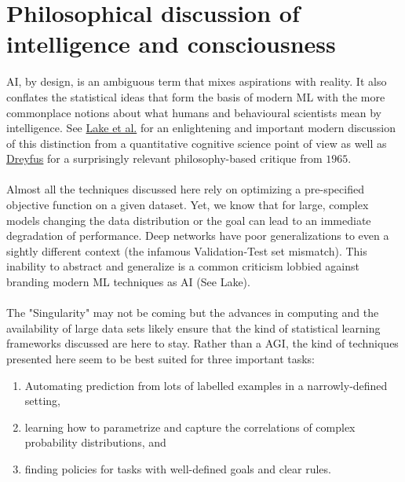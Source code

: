 \chapter{Philosophical discussion of intelligence and consciousness}
AI, by design, is an ambiguous term that mixes aspirations with reality. It also conflates the statistical ideas that form the basis of modern ML with the more commonplace notions about what humans and behavioural scientists mean by intelligence. See \href{https://arxiv.org/abs/1604.00289}{Lake et al.} for an enlightening and important modern discussion of this distinction from a quantitative cognitive science point of view as well as \href{https://www.rand.org/pubs/papers/P3244.html}{Dreyfus} for a surprisingly relevant philosophy-based critique from $1965$.\\
\\
Almost all the techniques discussed here rely on optimizing a pre-specified objective function on a given dataset. Yet, we know that for large, complex models changing the data distribution or the goal can lead to an immediate degradation of performance. Deep networks have poor generalizations to even a sightly different context (the infamous Validation-Test set mismatch). This inability to abstract and generalize is a common criticism lobbied against branding modern ML techniques as AI (See Lake).\\
\\
The "Singularity" may not be coming but the advances in computing and the availability of large data sets likely ensure that the kind of statistical learning frameworks discussed are here to stay. Rather than a AGI, the kind of techniques presented here seem to be best suited for three important tasks:
\begin{enumerate}
	\item Automating prediction from lots of labelled examples in a narrowly-defined setting,
	\item learning how to parametrize and capture the correlations of complex probability distributions, and
	\item finding policies for tasks with well-defined goals and clear rules.
\end{enumerate}



